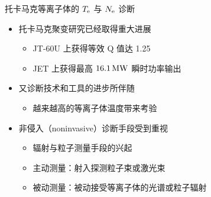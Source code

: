 \begin{CJK*}{UTF8}{kai}
\begin{frame}{托卡马克等离子体的 $T_{\rm e}$ 与 $N_{\rm e}$ 诊断}
    \begin{itemize}
      \item 托卡马克聚变研究已经取得重大进展
        \begin{itemize}
          \item JT-60U 上获得等效 Q 值达 1.25 
          \item JET 上获得最高 $16.1\,{\rm MW}$ 瞬时功率输出 
        \end{itemize}
      \bigskip
      \item 又诊断技术和工具的进步所伴随
        \begin{itemize}
          \item 越来越高的等离子体温度带来考验
        \end{itemize}
      \bigskip
      \item 非侵入（noninvasive）诊断手段受到重视
        \begin{itemize}
          \item 辐射与粒子测量手段的兴起
          \item 主动测量：射入探测粒子束或激光束
          \item 被动测量：被动接受等离子体的光谱或粒子辐射
        \end{itemize}
    \end{itemize}
%    	
%    	
%    	
\end{frame}


\end{CJK*}
